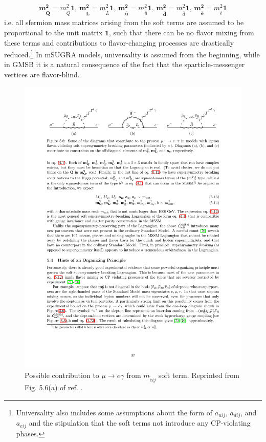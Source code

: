 \documentclass[dissertation.tex]{subfiles}
\begin{document}
\begin{eqnarray}
\label{eq:universailty_conditions}
\mathbf{m_{\widetilde{Q}}^{2}} = m_{\widetilde{Q}}^{2}\mathbf{1}\mbox{, }\mathbf{m_{\widetilde{L}}^{2}} = m_{\widetilde{L}}^{2}\mathbf{1}\mbox{, }\mathbf{m_{\widetilde{\overline{u}}}^{2}} = m_{\widetilde{\overline{u}}}^{2}\mathbf{1}\mbox{, }\mathbf{m_{\widetilde{\overline{d}}}^{2}} = m_{\widetilde{\overline{d}}}^{2}\mathbf{1}\mbox{, }\mathbf{m_{\widetilde{\overline{e}}}^{2}} = m_{\widetilde{\overline{e}}}^{2}\mathbf{1}
\end{eqnarray}
%
i.e. all sfermion mass matrices arising from the soft terms are assumed to be proportional to the unit matrix $\mathbf{1}$, such that there can be no flavor mixing from these terms and contributions to flavor-changing processes are drastically reduced.\footnote{Universality also includes some assumptions about the form of $a_{uij}$, $a_{dij}$, and $a_{eij}$ and the stipulation that the soft terms not introduce any CP-violating phases.}  In mSUGRA models, universality is assumed from the beginning, while in GMSB it is a natural consequence of the fact that the sparticle-messenger vertices are flavor-blind.

\begin{figure}
	\centering
	\includegraphics[scale=1.0]{muegamma}
	\caption{Possible contribution to $\mu\rightarrow e\gamma$ from $m_{\widetilde{\overline{e}}ij}$ soft term.  Reprinted from Fig. 5.6(a) of ref. \cite{SUSY_primer}.}
	\label{fig:muegamma}
\end{figure}
\end{document}
